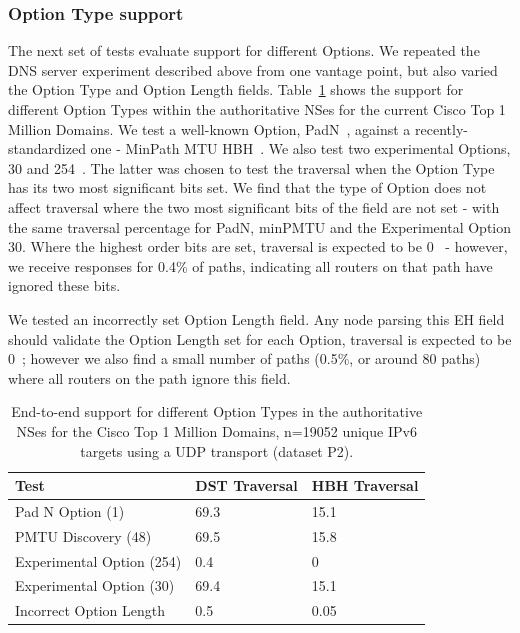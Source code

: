 \documentclass[conference]{IEEEtran}
\begin{document}
\subsubsection{Option Type support}

The next set of tests evaluate support for different Options. We repeated the DNS server experiment described above from one vantage point, but also varied the Option Type and Option Length fields. 
Table~\ref{tbl:option_type_support} shows the support for different Option Types within the authoritative NSes for the current Cisco Top 1 Million Domains. We test a well-known Option, PadN~\cite{rfc2460}, against a recently-standardized one - MinPath MTU HBH~\cite{rfc9268}. We also test two experimental Options, 30 and 254~\cite{RFC4727}. The latter was chosen to test the traversal when the Option Type has its two most significant bits set.
We find that the type of Option  does not affect traversal where the two most significant bits of the field are not set - with the same traversal percentage for PadN, minPMTU and the Experimental Option 30. Where the highest order bits are set, traversal is expected to be 0~\cite{RFC8200} - however, we  receive responses for 0.4\% of paths, indicating all routers on that path have ignored these bits.

We tested an incorrectly set Option Length field. Any node parsing this EH field should validate the Option Length set for each Option, traversal is expected to be 0~\cite{RFC8200}; however we also find a small number of paths (0.5\%, or around 80 paths) where all routers on the path ignore this field.

\begin{table}
\begin{tabular}{l|l|l}
Test                      & DST Traversal & HBH Traversal\\
\hline
Pad N Option (1)          & 69.3           & 15.1          \\
PMTU Discovery (48)       & 69.5           & 15.8          \\
Experimental Option (254) & 0.4            & 0             \\
Experimental Option (30)  & 69.4           & 15.1          \\
Incorrect Option Length   & 0.5            & 0.05            
\end{tabular}
\label{tbl:option_type_support}
\caption{End-to-end support for different Option Types in the authoritative NSes for the Cisco Top 1 Million Domains, n=19052 unique IPv6 targets using a UDP transport (dataset P2).}
\end{table}
\end{document}
